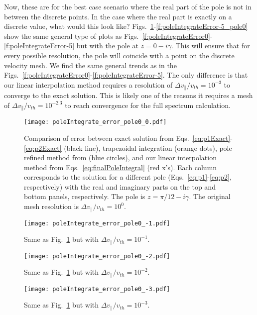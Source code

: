 Now, these are for the best case scenario where the real part of the pole is not in between the discrete points.
In the case where the real part is exactly on a discrete value, what would this look like? 
Figs.~\ref{f:poleIntegrateError0_pole0}-\ref{f:poleIntegrateError-5_pole0} show the same general type of plots as Figs.~\ref{f:poleIntegrateError0}-\ref{f:poleIntegrateError-5} but with the pole at $z=0-i\gamma$.
This will ensure that for every possible resolution, the pole will coincide with a point on the discrete velocity mesh.
We find the same general trends as in the Figs.~\ref{f:poleIntegrateError0}-\ref{f:poleIntegrateError-5}.
The only difference is that our linear interpolation method requires a resolution of $\Delta v_\parallel/v_{th}=10^{-3}$ to converge to the exact solution.
This is likely one of the reasons it requires a mesh of $\Delta v_\parallel/v_{th}=10^{-2.3}$ to reach convergence for the full spectrum calculation.


\begin{figure}[!htb]
	\texttt{[image: poleIntegrate\_error\_pole0\_0.pdf]}
	\caption{Comparison of error between exact solution from Eqs.~\ref{eq:p1Exact}-\ref{eq:p2Exact} (black line),
		trapezoidal integration (orange dots),
		pole refined method from \cite{longley2024} (blue circles),
		and our linear interpolation method from Eqs.~\ref{eq:finalPoleIntegral} (red x's).
		Each column corresponds to the solution for a different pole (Eqs.~\ref{eq:p1}-\ref{eq:p2}, respectively)
		with the real and imaginary parts on the top and bottom panels, respectively.
		The pole is $z=\pi/12-i\gamma$.
		The original mesh resolution is $\Delta v_\parallel/v_{th}=10^0$.}
	\label{f:poleIntegrateError0_pole0}
\end{figure}

\begin{figure}[!htb]
	\texttt{[image: poleIntegrate\_error\_pole0\_-1.pdf]}
	\caption{Same as Fig.~\ref{f:poleIntegrateError0_pole0} but with $\Delta v_\parallel/v_{th}=10^{-1}$.}
	\label{f:poleIntegrateError-1_pole0}
\end{figure}

\begin{figure}[!htb]
	\texttt{[image: poleIntegrate\_error\_pole0\_-2.pdf]}
	\caption{Same as Fig.~\ref{f:poleIntegrateError0_pole0} but with $\Delta v_\parallel/v_{th}=10^{-2}$.}
	\label{f:poleIntegrateError-2_pole0}
\end{figure}

\begin{figure}[!htb]
	\texttt{[image: poleIntegrate\_error\_pole0\_-3.pdf]}
	\caption{Same as Fig.~\ref{f:poleIntegrateError0_pole0} but with $\Delta v_\parallel/v_{th}=10^{-3}$.}
	\label{f:poleIntegrateError-3_pole0}
\end{figure}

